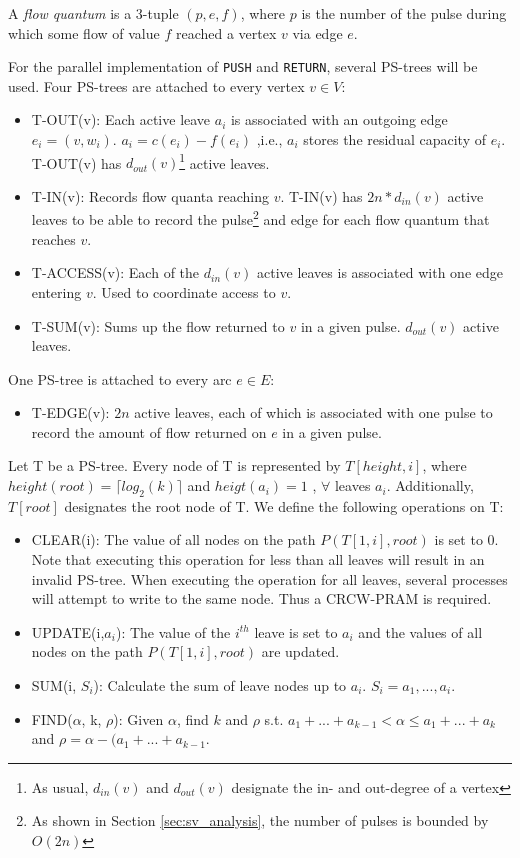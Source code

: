 \documentclass[a4paper,10pt, twocolumn]{article}
\begin{document}
A \emph{flow quantum} is a 3-tuple $(p, e, f)$, where $p$ is the number of the pulse during which some flow of value $f$ reached a vertex $v$ via edge $e$.

For the parallel implementation of \lstinline|PUSH| and \lstinline|RETURN|, several PS-trees will be used. Four PS-trees are attached to every vertex $v \in V$:
\begin{itemize}
	\item T-OUT(v): Each active leave $a_i$ is associated with an outgoing edge $e_i = (v, w_i)$. $a_i = c(e_i) - f(e_i)$ ,i.e., $a_i$ stores the residual capacity of $e_i$. T-OUT(v) has $d_{out}(v)$\footnote{As usual, $d_{in}(v)$ and $d_{out}(v)$ designate the in- and out-degree of a vertex} active leaves.
	\item T-IN(v): Records flow quanta reaching $v$. T-IN(v) has $2n*d_{in}(v)$ active leaves to be able to record the pulse\footnote{As shown in Section \ref{sec:sv_analysis}, the number of pulses is bounded by $O(2n)$} and edge for each flow quantum that reaches $v$. 
	\item T-ACCESS(v): Each of the $d_{in}(v)$ active leaves is associated with one edge entering $v$. Used to coordinate access to $v$.
	\item T-SUM(v): Sums up the flow returned to $v$ in a given pulse. $d_{out}(v)$ active leaves. 
\end{itemize}
One PS-tree is attached to every arc $e \in E$:
\begin{itemize}
	\item T-EDGE(v): $2n$ active leaves, each of which is associated with one pulse to record the amount of flow returned on $e$ in a given pulse.
\end{itemize}

Let T be a PS-tree. Every node of T is represented by $T[height, i]$, where $height(root) = \lceil log_2(k) \rceil$ and $heigt(a_i) = 1$ , $\forall$ leaves $a_i$. Additionally, $T[root]$ designates the root node of T. We define the following operations on T:
\begin{itemize}
	\item CLEAR(i): The value of all nodes on the path $P(T[1,i],root)$ is set to 0. Note that executing this operation for less than all leaves will result in an invalid PS-tree. When executing the operation for all leaves, several processes will attempt to write to the same node. Thus a CRCW-PRAM is required.
	\item UPDATE(i,$a_i$): The value of the $i^{th}$ leave is set to $a_i$ and the values of all nodes on the path $P(T[1,i],root)$ are updated.
	\item SUM(i, $S_i$): Calculate the sum of leave nodes up to $a_i$. $S_i = a_1,...,a_i$.
	\item FIND($\alpha$, k, $\rho$): Given $\alpha$, find $k$ and $\rho$ s.t. $a_1+...+a_{k-1} < \alpha \leq a_1+...+a_k$ and $\rho = \alpha - (a_1+...+a_{k-1}$.
\end{itemize}  
\end{document}

